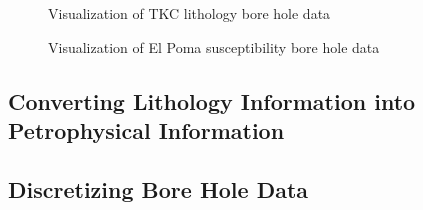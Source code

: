  \begin{figure} [h]
    \centering
    \caption{Visualization of TKC lithology bore hole data}
    \label{fig:TKCBHvis}
\end{figure}

 \begin{figure} [h]
    \centering
    \caption{Visualization of El Poma susceptibility bore hole data}
    \label{fig:EPBHvis}
\end{figure}

\subsection{Converting Lithology Information into Petrophysical Information}
\label{subsec:lithBH}


\subsection{Discretizing Bore Hole Data}
\label{subsec:discBH}

